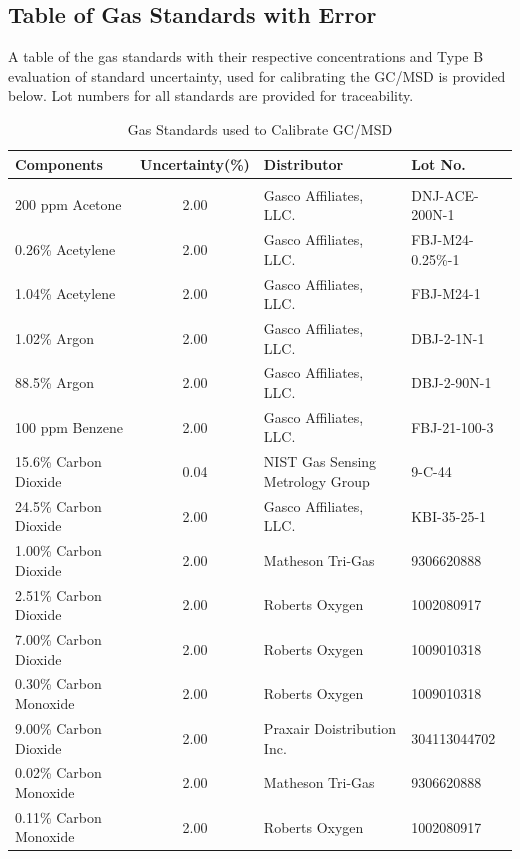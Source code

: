 \documentclass[12pt]{article}
\begin{document}
\pagebreak
\subsection{Table of Gas Standards with Error}
\label{sssec:Table of Gas Standards with Error}
A table of the gas standards with their respective concentrations and Type B evaluation of standard uncertainty, used for calibrating the GC/MSD is provided below. Lot numbers for all standards are provided for traceability.

\begin{table}[h!]

\caption{Gas Standards used to Calibrate GC/MSD}
\label{tab:Gas_Standards_Table}
\centering
	\footnotesize
	\begin{tabular}{lcll}
			\hline
\textbf{Components} &\textbf{Uncertainty(\%)}& \textbf{Distributor}	& \textbf{Lot No.}		\\
\hline
\\[0.001cm]
200 ppm Acetone		&	2.00	&	Gasco Affiliates, LLC. 		&	DNJ-ACE-200N-1		\\
0.26\% Acetylene		&	2.00	&	Gasco Affiliates, LLC.		&	FBJ-M24-0.25\%-1		\\
1.04\% Acetylene		&	2.00	&	Gasco Affiliates, LLC.		&	FBJ-M24-1		\\
1.02\% Argon		&	2.00	&	Gasco Affiliates, LLC.		&	DBJ-2-1N-1		\\
88.5\% Argon		&	2.00	&	Gasco Affiliates, LLC.		&	DBJ-2-90N-1		\\
100 ppm Benzene		&	2.00	&	Gasco Affiliates, LLC.		&	FBJ-21-100-3		\\
15.6\% Carbon Dioxide	&	0.04	&	NIST Gas Sensing Metrology Group		&	9-C-44		\\
24.5\% Carbon Dioxide	&	2.00	&	Gasco Affiliates, LLC. 		&	KBI-35-25-1		\\
1.00\% Carbon Dioxide	&	2.00	&	Matheson Tri-Gas		&	9306620888		\\
2.51\% Carbon Dioxide	&	2.00	&	Roberts Oxygen			&	1002080917		\\
7.00\% Carbon Dioxide	&	2.00	&	Roberts Oxygen			&	1009010318		\\
0.30\% Carbon Monoxide	&	2.00	&	Roberts Oxygen			&	1009010318			\\
9.00\% Carbon Dioxide	&	2.00	&	Praxair Doistribution Inc. 	&	304113044702		\\
0.02\% Carbon Monoxide	&	2.00	&	Matheson Tri-Gas		&	9306620888		\\
0.11\% Carbon Monoxide	&	2.00	&	Roberts Oxygen			&	1002080917		\\

\end{tabular}
\end{table}
\end{document}
